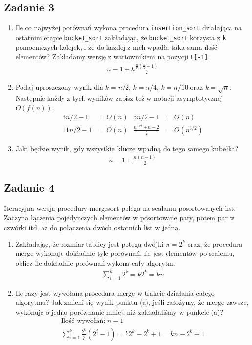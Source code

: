 \documentclass{article}
\begin{document}
\subsection*{Zadanie 3}
\begin{enumerate}[label=(\alph*)]
    \item Ile co najwyżej porównań wykona procedura \verb|insertion_sort| działająca na ostatnim
          etapie \verb|bucket_sort| zakładając, że \verb|bucket_sort| korzysta z \verb|k| pomocniczych kolejek,
          i że do każdej z nich wpadła taka sama ilość elementów? Zakładamy wersję z wartownikiem
          na pozycji \verb|t[-1]|.
          \begin{gather*}
              n-1 + k \frac{\frac{n}{k}(\frac{n}{k}-1)}{2}
          \end{gather*}
    \item Podaj uproszczony wynik dla $k = n/2$, $k = n/4$, $k = n/10$ oraz $k = \sqrt{n}$.
          Następnie każdy z tych wyników zapisz też w notacji asymptotycznej $O(f(n))$.
          \begin{align*}
              3n/2 - 1  & = O(n) & 5n/2 - 1              & = O(n)       \\
              11n/2 - 1 & = O(n) & \frac{n^{3/2}+n-2}{2} & = O(n^{3/2})
          \end{align*}
    \item Jaki będzie wynik, gdy wszystkie klucze wpadną do tego samego kubełka?
          \begin{gather*}
              n-1 + \frac{n(n-1)}{2}
          \end{gather*}
\end{enumerate}

\subsection*{Zadanie 4}
Iteracyjna wersja procedury mergesort polega na scalaniu posortowanych list. Zaczyna
łączenia pojedynczych elementów w posortowane pary, potem par w czwórki itd. aż do
połączenia dwóch ostatnich list w jedną.
\begin{enumerate}[label=(\alph*)]
    \item Zakładając, że rozmiar tablicy jest potęgą dwójki $n = 2^k$ oraz, że procedura merge
          wykonuje dokładnie tyle porównań, ile jest elementów po scaleniu, oblicz ile dokładnie
          porównań wykona cały algorytm.
          \begin{gather*}
              \sum_{i=1}^{k} 2^k = k 2^k = kn
          \end{gather*}
    \item Ile razy jest wywołana procedura merge w trakcie działania całego algorytmu? Jak
          zmieni się wynik punktu (a), jeśli założymy, że merge zawsze, wykonuje o jedno
          porównanie mniej, niż zakładaliśmy w punkcie (a)?
          \begin{gather*}
              \text{Ilość wywołań: } n - 1 \\
              \sum_{i=1}^{k} \frac{2^k}{2^i}(2^i-1) = k2^k - 2^k + 1 = kn - 2^k + 1
          \end{gather*}
\end{enumerate}
\end{document}
